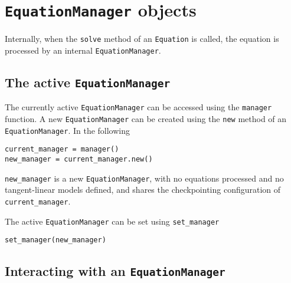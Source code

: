 \documentclass[11pt]{article}
\begin{document}
\section{\texttt{EquationManager} objects}\label{sect:EquationManager}

Internally, when the \texttt{solve} method of an \texttt{Equation} is called,
the equation is processed by an internal \texttt{EquationManager}.

\subsection{The active \texttt{EquationManager}}\label{sect:active_EquationManager}

The currently active \texttt{EquationManager} can be accessed using the
\texttt{manager} function. A new \texttt{EquationManager} can be created using
the \texttt{new} method of an \texttt{EquationManager}. In the following
\begin{lstlisting}
current_manager = manager()
new_manager = current_manager.new()
\end{lstlisting}
\texttt{new\_manager} is a new \texttt{EquationManager}, with no equations
processed and no tangent-linear models defined, and shares the checkpointing
configuration of \texttt{current\_manager}.

The active \texttt{EquationManager} can be set using
\texttt{set\_manager}
\begin{lstlisting}
set_manager(new_manager)
\end{lstlisting}

\subsection{Interacting with an \texttt{EquationManager}}\label{sect:EquationManager_control}
\end{document}
